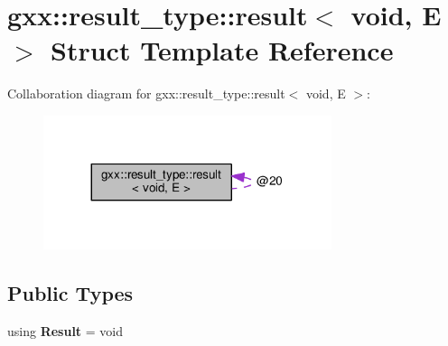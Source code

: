 \hypertarget{structgxx_1_1result__type_1_1result_3_01void_00_01E_01_4}{}\section{gxx\+:\+:result\+\_\+type\+:\+:result$<$ void, E $>$ Struct Template Reference}
\label{structgxx_1_1result__type_1_1result_3_01void_00_01E_01_4}


Collaboration diagram for gxx\+:\+:result\+\_\+type\+:\+:result$<$ void, E $>$\+:
\nopagebreak
\begin{figure}[H]
\begin{center}
\leavevmode
\includegraphics[width=239pt]{structgxx_1_1result__type_1_1result_3_01void_00_01E_01_4__coll__graph}
\end{center}
\end{figure}
\subsection*{Public Types}
\begin{DoxyCompactItemize}
\item 
using {\bfseries Result} = void\hypertarget{structgxx_1_1result__type_1_1result_3_01void_00_01E_01_4_aeec0e13b6afbe283afb57252505f433d}{}\label{structgxx_1_1result__type_1_1result_3_01void_00_01E_01_4_aeec0e13b6afbe283afb57252505f433d}

\end{DoxyCompactItemize}
